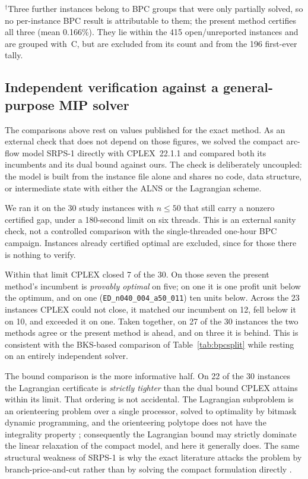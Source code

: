 \documentclass[preprint,12pt]{elsarticle}
\begin{document}
\begin{table}[t]
\smallskip
{\footnotesize $^{\dagger}$Three further instances belong to BPC groups that were only partially solved, so no per-instance BPC result is attributable to them; the present method certifies all three (mean 0.166\%). They lie within the 415 open/unreported instances and are grouped with~C, but are excluded from its count and from the 196 first-ever tally.}
\end{table}

\subsection{Independent verification against a general-purpose MIP solver}

The comparisons above rest on values published for the exact method. As an
external check that does not depend on those figures, we solved the compact
arc-flow model SRPS-1 directly with CPLEX~22.1.1 and compared both its
incumbents and its dual bound against ours. The check is deliberately
uncoupled: the model is built from the instance file alone and shares no code,
data structure, or intermediate state with either the ALNS or the Lagrangian
scheme.

We ran it on the 30 study instances with $n\le 50$ that still carry a nonzero
certified gap, under a 180-second limit on six threads. This is an external
sanity check, not a controlled comparison with the single-threaded one-hour BPC
campaign. Instances already
certified optimal are excluded, since for those there is nothing to verify.

Within that limit CPLEX closed 7 of the 30. On those seven the present method's
incumbent is \emph{provably optimal} on five; on one it is one profit unit below
the optimum, and on one (\texttt{ED\_n040\_004\_a50\_011}) ten units below.
Across the 23 instances CPLEX could not close, it matched our incumbent on 12,
fell below it on 10, and exceeded it on one. Taken together, on 27 of the 30
instances the two methods agree or the present method is ahead, and on three it
is behind. This is consistent with the BKS-based comparison of
Table~\ref{tab:bpcsplit} while resting on an entirely independent solver.

The bound comparison is the more informative half. On 22 of the 30 instances the
Lagrangian certificate is \emph{strictly tighter} than the dual bound CPLEX
attains within its limit. That ordering is not accidental. The Lagrangian
subproblem is an orienteering problem over a single processor, solved to
optimality by bitmask dynamic programming, and the orienteering polytope does
not have the integrality property \cite{Geoffrion1974Lagrangean};
consequently the Lagrangian bound may
strictly dominate the linear relaxation of the compact model, and here it
generally does. The same structural weakness of SRPS-1 is why the exact
literature attacks the problem by branch-price-and-cut
\cite{Barnhart1998BranchPrice} rather than by solving the compact formulation
directly \cite{RieraLedesma2021SRPS}.
\end{document}
